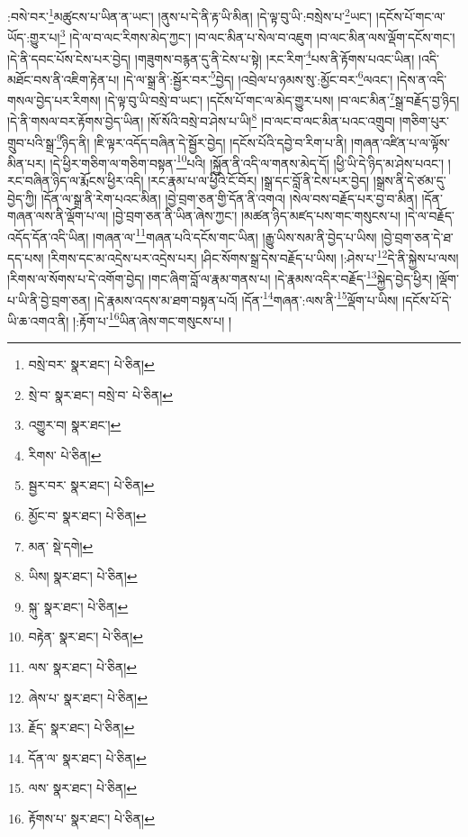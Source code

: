 :བསེ་བར་\footnote{བསྲེ་བར་  སྣར་ཐང་།  པེ་ཅིན། }མཚུངས་པ་ཡིན་ན་ཡང་། །ནུས་པ་དེ་ནི་རྟ་ཡི་མིན། །དེ་ལྟ་བུ་ཡི་:བསྲེས་པ་\footnote{སྲེ་བ་  སྣར་ཐང་། བསྲེ་བ་  པེ་ཅིན། }ཡང་། །དངོས་པོ་གང་ལ་ཡོད་:གྱུར་པ།\footnote{འགྱུར་བ།  སྣར་ཐང་། } །དེ་ལ་བ་ལང་རིགས་མེད་ཀྱང་། །བ་ལང་མིན་པ་སེལ་བ་འཇུག །བ་ལང་མིན་ལས་ལྡོག་དངོས་གང་། །དེ་ནི་དབང་པོས་ངེས་པར་བྱེད། །གཟུགས་བརྙན་དུ་ནི་ངེས་པ་སྟེ། །རང་རིག་\footnote{རིགས་  པེ་ཅིན། }པས་ནི་རྟོགས་པའང་ཡིན། །འདི་མཐོང་བས་ནི་འཇིག་རྟེན་པ། །དེ་ལ་སྒྲ་ནི་:སྦྱོར་བར་\footnote{སྦྱར་བར་  སྣར་ཐང་།  པེ་ཅིན། }བྱེད། །འབྲེལ་པ་ཉམས་སུ་:མྱོང་བར་\footnote{མྱོང་བ་  སྣར་ཐང་།  པེ་ཅིན། }ལའང་། །དེས་ན་འདི་གསལ་བྱེད་པར་རིགས། །དེ་ལྟ་བུ་ཡི་བསྲེ་བ་ཡང་། །དངོས་པོ་གང་ལ་མེད་གྱུར་པས། །བ་ལང་མིན་\footnote{མན་  སྡེ་དགེ། }སྒྲ་བརྗོད་བྱ་ཉིད། །དེ་ནི་གསལ་བར་རྟོགས་བྱེད་ཡིན། །སོ་སོའི་བསྲེ་བ་ཤེས་པ་ཡི།\footnote{ཡིས།  སྣར་ཐང་།  པེ་ཅིན། } །བ་ལང་བ་ལང་མིན་པའང་འགྲུབ། །གཅིག་པུར་གྲུབ་པའི་སྒྲ་\footnote{སྐུ་  སྣར་ཐང་།  པེ་ཅིན། }ཉིད་ནི། །ཇི་ལྟར་འདོད་བཞིན་དེ་སྦྱོར་བྱེད། །དངོས་པོའི་དབྱེ་བ་རིག་པ་ནི། །གཞན་འཛིན་པ་ལ་ལྟོས་མིན་པར། །དེ་ཕྱིར་གཅིག་ལ་གཅིག་བསྟན་\footnote{བརྟེན་  སྣར་ཐང་།  པེ་ཅིན། }པའི། །སྐྱོན་ནི་འདི་ལ་གནས་མེད་དོ། །ཕྱི་ཡི་དེ་ཉིད་མ་ཤེས་པའང་། །རང་བཞིན་ཉིད་ལ་རྨོངས་ཕྱིར་འདི། །རང་རྣམ་པ་ལ་ཕྱིའི་ངོ་བོར། །སྒྲ་དང་བློ་ནི་ངེས་པར་བྱེད། །སྒྲས་ནི་དེ་ཙམ་དུ་བྱེད་ཀྱི། །དོན་ལ་སྒྲ་ནི་རེག་པའང་མིན། །བྱེ་བྲག་ཅན་གྱི་དོན་ནི་འགའ། །སེལ་བས་བརྗོད་པར་བྱ་བ་མིན། །དོན་གཞན་ལས་ནི་ལྡོག་པ་ལ། །བྱེ་བྲག་ཅན་ནི་ཡིན་ཞེས་ཀྱང་། །མཚན་ཉིད་མཛད་པས་གང་གསུངས་པ། །དེ་ལ་བརྗོད་འདོད་དོན་འདི་ཡིན། །གཞན་ལ་\footnote{ལས་  སྣར་ཐང་།  པེ་ཅིན། }གཞན་པའི་དངོས་གང་ཡིན། །རྒྱུ་ཡིས་སམ་ནི་བྱེད་པ་ཡིས། །བྱེ་བྲག་ཅན་དེ་ཐ་དད་པས། །རིགས་དང་མ་འདྲེས་པར་འདྲེས་པར། །ཤིང་སོགས་སྒྲ་དེས་བརྗོད་པ་ཡིས། །:ཤེས་པ་\footnote{ཞེས་པ་  སྣར་ཐང་།  པེ་ཅིན། }དེ་ནི་སྐྱེས་པ་ལས། །རིགས་ལ་སོགས་པ་དེ་འགོག་བྱེད། །གང་ཞིག་བློ་ལ་རྣམ་གནས་པ། །དེ་རྣམས་འདིར་བརྗོད་\footnote{རྗོད་  སྣར་ཐང་།  པེ་ཅིན། }སྐྱེད་བྱེད་ཕྱིར། །ལྡོག་པ་ཡི་ནི་བྱེ་བྲག་ཅན། །དེ་རྣམས་འདས་མ་ཐག་བསྟན་པའོ། །དོན་\footnote{དོན་ལ་  སྣར་ཐང་།  པེ་ཅིན། }གཞན་:ལས་ནི་\footnote{ལས་  སྣར་ཐང་།  པེ་ཅིན། }ལྡོག་པ་ཡིས། །དངོས་པོ་དེ་ཡི་ཆ་འགའ་ནི། །:རྟོག་པ་\footnote{རྟོགས་པ་  སྣར་ཐང་།  པེ་ཅིན། }ཡིན་ཞེས་གང་གསུངས་པ། །
